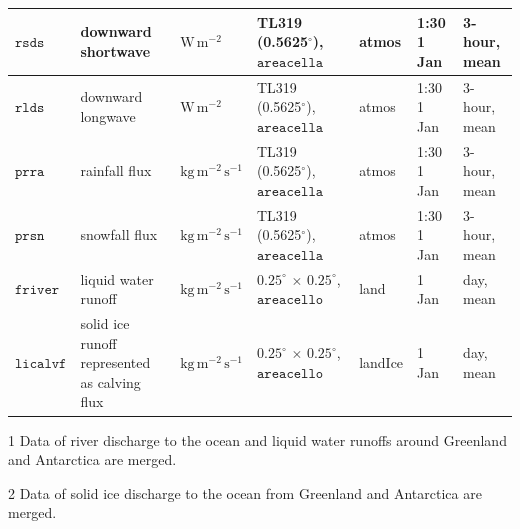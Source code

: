 \documentclass[dvipdfmx]{elsarticle_mod}
\begin{document}
\begin{table}[h]
\begin{threeparttable}
\begin{tabular*}{17.5cm}{p{1.4cm}|p{3.3cm}|p{1.6cm}|p{2.5cm}|p{1.4cm}|p{1.5cm}|p{2.8cm}}
$\texttt{rsds}$ &  downward shortwave     & $\mathrm{W}\,\mathrm{m}^{-2}$ & TL319 (0.5625$^{\circ}$), $\texttt{areacella}$ & atmos & 1:30 1 Jan & 3-hour, mean \\ \hline
$\texttt{rlds}$ &  downward longwave      & $\mathrm{W}\,\mathrm{m}^{-2}$ & TL319 (0.5625$^{\circ}$), $\texttt{areacella}$ & atmos & 1:30 1 Jan & 3-hour, mean \\ \hline
$\texttt{prra}$ & rainfall flux   & $\mathrm{kg}\,\mathrm{m}^{-2}\,\mathrm{s}^{-1}$ & TL319 (0.5625$^{\circ}$), $\texttt{areacella}$ & atmos & 1:30 1 Jan & 3-hour, mean \\ \hline
$\texttt{prsn}$ & snowfall flux   & $\mathrm{kg}\,\mathrm{m}^{-2}\,\mathrm{s}^{-1}$ & TL319 (0.5625$^{\circ}$), $\texttt{areacella}$ & atmos & 1:30 1 Jan & 3-hour, mean \\ \hline \hline
$\texttt{friver}$ & liquid water runoff\tnote{1} & $\mathrm{kg}\,\mathrm{m}^{-2}\,\mathrm{s}^{-1}$ & $0.25^{\circ}\,\times\,0.25^{\circ}$, $\texttt{areacello}$ & land & 1 Jan & day, mean \\ \hline
$\texttt{licalvf}$ & solid ice runoff represented as calving flux\tnote{2} & $\mathrm{kg}\,\mathrm{m}^{-2}\,\mathrm{s}^{-1}$ & $0.25^{\circ}\,\times\,0.25^{\circ}$, $\texttt{areacello}$ & landIce & 1 Jan & day, mean \\ \hline
\end{tabular*}
\begin{tablenotes}
\item[1]{Data of river discharge to the ocean \citep{Suzuki_et_al_2018} and liquid water runoffs around Greenland \citep{Bamber_et_al_2018} and Antarctica \citep{Depoorter_et_al_2013} are merged.}
\item[2]{Data of solid ice discharge to the ocean from Greenland \citep{Bamber_et_al_2018} and Antarctica \citep{Depoorter_et_al_2013} are merged.} 
\end{tablenotes}
\end{threeparttable}
\end{table}
\end{document}
